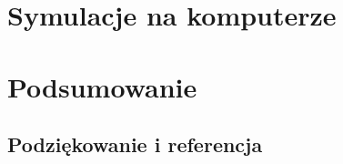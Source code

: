 \documentclass[12pt, a4paper]{report}
\begin{document}
\clearpage 

\tableofcontents

\setlength{\baselineskip}{18pt}
\clearpage 

\clearpage 

\clearpage 

\chapter{Symulacje na komputerze}

\chapter{Podsumowanie}

\section*{Podziękowanie i referencja}
\end{document}
